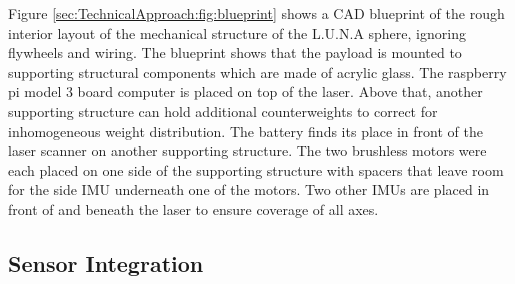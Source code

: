 Figure \ref{sec:TechnicalApproach:fig:blueprint} shows a CAD blueprint of the rough interior layout of the mechanical structure of the L.U.N.A sphere, ignoring flywheels and wiring. The blueprint shows that the payload is mounted to supporting structural components which are made of acrylic glass. The raspberry pi model 3 board computer is placed on top of the laser. Above that, another supporting structure can hold additional counterweights to correct for inhomogeneous weight distribution.                                                                                                     
The battery finds its place in front of the laser scanner on another supporting structure. The two brushless motors were each placed on one side of the supporting structure with spacers that leave room for the side IMU underneath one of the motors. Two other IMUs are placed in front of and beneath the laser to ensure coverage of all axes.                                                                                 
                                                                                                                                                                                                                  
\subsection{Sensor Integration}                                                                                                                                                                                   
\label{sec:TechnicalApproach:SensorIntegration}

